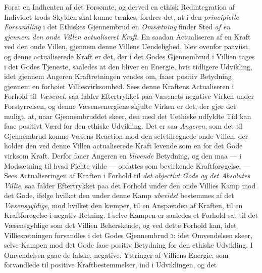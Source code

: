Forat en Indhenten af det Forsømte, og derved en ethisk Redintegration af
Individet trods Skylden skal kunne tænkes, fordres det, at i den
\emph{principielle Forvandling} i det Ethiskes Gjennembrud en \emph{Omsætning}
finder Sted \emph{af en gjennem den onde Villen actualiseret Kraft}. En saadan
Actualiseren af en Kraft ved den onde Villen, gjennem denne Villens Uendelighed,
blev ovenfor paaviist,
 og denne actualiserede Kraft er det, der i det Godes Gjennembrud i Villien tages
i det Godes Tjeneste, saaledes at den bliver en Energie, hvis tidligere
Udvikling, idet gjennem Angeren Kraftretningen vendes om, faaer positiv Betydning
gjennem en forhøiet Villiesvirksomhed. Sees denne Kraftens Actualiseren i Forhold
til \emph{Væsenet}, saa falder Eftertrykket paa Væsenets negative Virken under
Forstyrrelsen, og denne Væsensenergiens skjulte Virken er det, der gjør det
muligt, at, naar Gjennembruddet skeer, den med det Uethiske udfyldte Tid kan faae
positivt Værd for den ethiske Udvikling. Det er saa \emph{Angeren}, som det til
Gjennembrud komne Væsens Reaction mod den selvtilregnede onde Villen, der holder
den ved denne Villen actualiserede Kraft levende som en for det Gode virksom
Kraft. Derfor faaer Angeren en \emph{blivende} Betydning, og den maa --- i
Modsætning til hvad Fichte vilde --- opfattes som bevirkende Kraftforøgelse. ---
Sees Actualiseringen af Kraften i Forhold til \emph{det objectivt Gode og det
Absolutes Villie}, saa falder Eftertrykket paa det Forhold under den onde Villies
Kamp mod det Gode, ifølge hvilket den under denne Kamp \emph{ubevidst} bestemmes
af det \emph{Væsensgyldige}, mod hvilket den kæmper, til en Anspænden af Kraften,
til en Kraftforøgelse i negativ Retning. I selve Kampen er saaledes et Forhold
sat til det Væsensgyldige som det Villien Beherskende, og ved dette Forhold kan,
idet Villiesretningen forvandles i det Godes Gjennembrud ɔ: idet Omvendelsen
skeer, selve Kampen mod det Gode faae positiv Betydning for den ethiske
Udvikling. I Omvendelsen gaae de falske, negative, Yttringer af Villiens Energie,
som forvandlede til positive Kraftbestemmelser, ind i Udviklingen, og det
